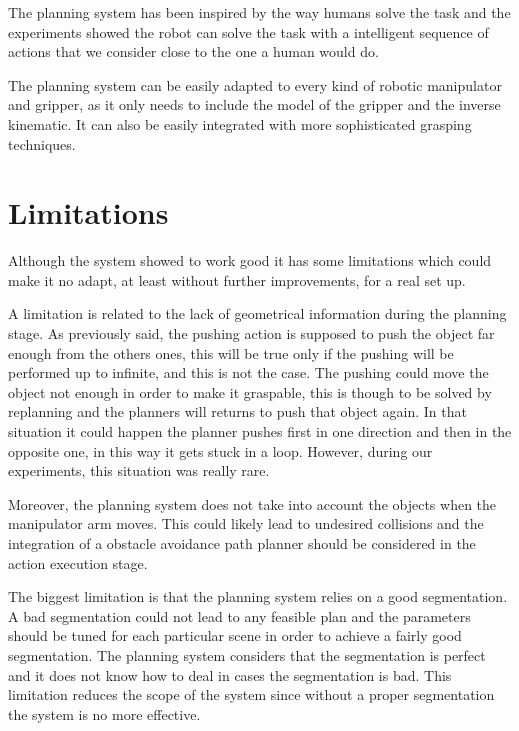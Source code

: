 The planning system has been inspired by the way humans solve the task and the experiments showed the robot can solve the task with a intelligent sequence of actions that we consider close to the one a human would do. 

The planning system can be easily adapted to every kind of robotic manipulator and gripper, as it only needs to include the model of the gripper and the inverse kinematic. It can also be easily integrated with more sophisticated grasping techniques.


 



\section*{Limitations}
Although the system showed to work good it has some limitations which could make it no adapt, at least without further improvements, for a real set up. 

A limitation is related to the lack of geometrical information during the planning stage. 
As previously said, the pushing action is supposed to push the object far enough from the others ones, this will be true only if the pushing will be performed up to infinite, and this is not the case. The pushing could move the object not enough in order to make it graspable, this is though to be solved by replanning and the planners will returns to push that object again.
In that situation it could happen the planner pushes first in one direction and then in the opposite one, in this way it gets stuck in a loop. However, during our experiments, this situation was really rare. 

Moreover, the planning system does not take into account the objects when the manipulator arm moves. This could likely lead to undesired collisions and the integration of a obstacle avoidance path planner should be considered in the action execution stage. 

The biggest limitation is that the planning system relies on a good segmentation. A bad segmentation could not lead to any feasible plan and the parameters should be tuned for each particular scene in order to achieve a fairly good segmentation. The planning system considers that the segmentation is perfect and it does not know how to deal in cases the segmentation is bad. This limitation reduces the scope of the system since without a proper segmentation the system is no more effective. 

